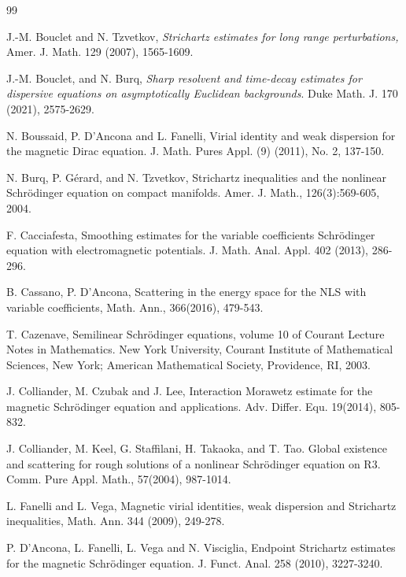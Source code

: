\documentclass[10pt%
]{amsart}
\numberwithin{equation}{section}
\theoremstyle{definition}
\begin{document}
\begin{thebibliography}{99}
	
	
	J.-M. Bouclet and N. Tzvetkov, \emph{Strichartz estimates for long range perturbations,} Amer. J. Math. 129  (2007), 1565-1609.
	
	 J.-M. Bouclet, and N. Burq, \emph{Sharp resolvent and time-decay estimates for dispersive equations
		on asymptotically Euclidean backgrounds}. Duke Math. J. 170 (2021), 2575-2629.
	
	
	
	 N. Boussaid, P. D'Ancona and L. Fanelli, Virial identity and weak dispersion for the magnetic Dirac equation.
	J. Math. Pures Appl. (9) (2011), No. 2, 137-150.
	
	 N. Burq, P. G\'erard, and N. Tzvetkov, Strichartz inequalities and the nonlinear Schr\"odinger equation on compact manifolds. Amer. J. Math., 126(3):569-605, 2004.
	
	
	 F. Cacciafesta, Smoothing estimates for the variable coefficients Schr\"odinger equation with electromagnetic potentials. J. Math. Anal. Appl. 402 (2013), 286-296.
	
	 B. Cassano, P. D'Ancona, Scattering in the energy space for the NLS with variable coefficients, Math. Ann., 366(2016), 479-543.
	
	 T. Cazenave, Semilinear Schr\"odinger equations, volume 10 of Courant Lecture Notes in Mathematics.
	New York University, Courant Institute of Mathematical Sciences, New York; American Mathematical Society, Providence, RI, 2003.
	
	 J. Colliander, M. Czubak and J. Lee, Interaction Morawetz estimate for the magnetic Schr\"odinger
	equation and applications. Adv. Differ. Equ. 19(2014), 805-832.
	
	
	
	 J. Colliander, M. Keel, G. Staffilani, H. Takaoka, and T. Tao. Global existence and scattering for rough solutions of a nonlinear Schr\"odinger equation on R3. Comm. Pure Appl. Math., 57(2004), 987-1014.
	
	 L. Fanelli and L. Vega, Magnetic virial identities, weak dispersion and Strichartz inequalities, Math. Ann. 344 (2009), 249-278.
	
	 P. D'Ancona, L. Fanelli, L. Vega and N. Visciglia, Endpoint Strichartz estimates for the magnetic Schr\"odinger equation. J. Funct. Anal. 258 (2010), 3227-3240.
	

\end{thebibliography}
\end{document}
